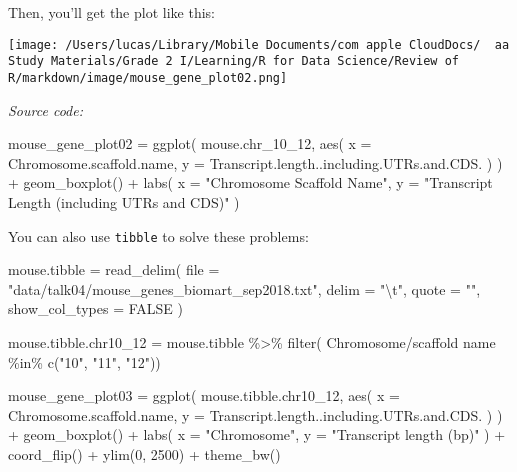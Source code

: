 \documentclass[
]{article}
\let\oldincludegraphics\includegraphics
\renewcommand{\includegraphics}[2][]{\begin{center}\oldincludegraphics[#1]{#2}\end{center}}
\newenvironment{Shaded}{}{}
\newcommand{\AttributeTok}[1]{\textcolor[rgb]{0.49,0.56,0.16}{#1}}
\newcommand{\ConstantTok}[1]{\textcolor[rgb]{0.53,0.00,0.00}{#1}}
\newcommand{\DecValTok}[1]{\textcolor[rgb]{0.25,0.63,0.44}{#1}}
\newcommand{\FunctionTok}[1]{\textcolor[rgb]{0.02,0.16,0.49}{#1}}
\newcommand{\NormalTok}[1]{#1}
\newcommand{\OtherTok}[1]{\textcolor[rgb]{0.00,0.44,0.13}{#1}}
\newcommand{\SpecialCharTok}[1]{\textcolor[rgb]{0.25,0.44,0.63}{#1}}
\newcommand{\StringTok}[1]{\textcolor[rgb]{0.25,0.44,0.63}{#1}}
\begin{document}
Then, you'll get the plot like this:

\texttt{[image: /Users/lucas/Library/Mobile Documents/com~apple~CloudDocs/~~aa Study Materials/Grade 2 I/Learning/R for Data Science/Review of R/markdown/image/mouse\_gene\_plot02.png]}

\emph{Source code:}

\begin{Shaded}
\begin{Highlighting}[]
\NormalTok{mouse\_gene\_plot02 }\OtherTok{=}
  \FunctionTok{ggplot}\NormalTok{(}
\NormalTok{    mouse.chr\_10\_12,}
    \FunctionTok{aes}\NormalTok{(}
      \AttributeTok{x =}\NormalTok{ Chromosome.scaffold.name,}
      \AttributeTok{y =}\NormalTok{ Transcript.length..including.UTRs.and.CDS.}
\NormalTok{    )}
\NormalTok{  ) }\SpecialCharTok{+}
  \FunctionTok{geom\_boxplot}\NormalTok{() }\SpecialCharTok{+}
  \FunctionTok{labs}\NormalTok{(}
    \AttributeTok{x =} \StringTok{"Chromosome Scaffold Name"}\NormalTok{,}
    \AttributeTok{y =} \StringTok{"Transcript Length (including UTRs and CDS)"}
\NormalTok{  )}
\end{Highlighting}
\end{Shaded}

You can also use \texttt{tibble} to solve these problems:

\begin{Shaded}
\begin{Highlighting}[]
\NormalTok{mouse.tibble }\OtherTok{=}
  \FunctionTok{read\_delim}\NormalTok{(}
    \AttributeTok{file =} \StringTok{"data/talk04/mouse\_genes\_biomart\_sep2018.txt"}\NormalTok{,}
    \AttributeTok{delim =} \StringTok{"}\SpecialCharTok{\textbackslash{}t}\StringTok{"}\NormalTok{,}
    \AttributeTok{quote =} \StringTok{""}\NormalTok{,}
    \AttributeTok{show\_col\_types =} \ConstantTok{FALSE}
\NormalTok{  )}

\NormalTok{mouse.tibble.chr10\_12 }\OtherTok{=}
\NormalTok{  mouse.tibble }\SpecialCharTok{\%\textgreater{}\%} \FunctionTok{filter}\NormalTok{(}
    \StringTok{\textasciigrave{}}\AttributeTok{Chromosome/scaffold name}\StringTok{\textasciigrave{}} \SpecialCharTok{\%in\%} \FunctionTok{c}\NormalTok{(}\StringTok{"10"}\NormalTok{, }\StringTok{"11"}\NormalTok{, }\StringTok{"12"}\NormalTok{))}


\NormalTok{mouse\_gene\_plot03 }\OtherTok{=}
    \FunctionTok{ggplot}\NormalTok{(}
\NormalTok{        mouse.tibble.chr10\_12,}
        \FunctionTok{aes}\NormalTok{(}
        \AttributeTok{x =}\NormalTok{ Chromosome.scaffold.name,}
        \AttributeTok{y =}\NormalTok{ Transcript.length..including.UTRs.and.CDS.}
\NormalTok{        )}
\NormalTok{    ) }\SpecialCharTok{+}
    \FunctionTok{geom\_boxplot}\NormalTok{() }\SpecialCharTok{+}
    \FunctionTok{labs}\NormalTok{(}
        \AttributeTok{x =} \StringTok{"Chromosome"}\NormalTok{,}
        \AttributeTok{y =} \StringTok{"Transcript length (bp)"}
\NormalTok{    ) }\SpecialCharTok{+}
    \FunctionTok{coord\_flip}\NormalTok{() }\SpecialCharTok{+}
    \FunctionTok{ylim}\NormalTok{(}\DecValTok{0}\NormalTok{, }\DecValTok{2500}\NormalTok{) }\SpecialCharTok{+}
    \FunctionTok{theme\_bw}\NormalTok{()}
\end{Highlighting}
\end{Shaded}
\end{document}
